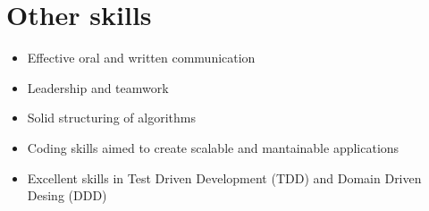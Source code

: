 \documentclass[a4paper,10.9pt]{article}
\begin{document}
\section{Other skills}

\begin{itemize}
	\item Effective oral and written communication
\item Leadership and teamwork
\item Solid structuring of algorithms
\item Coding skills aimed to create scalable and mantainable applications
\item Excellent skills in Test Driven Development (TDD) and Domain Driven Desing (DDD) 
\end{itemize}
\end{document}
